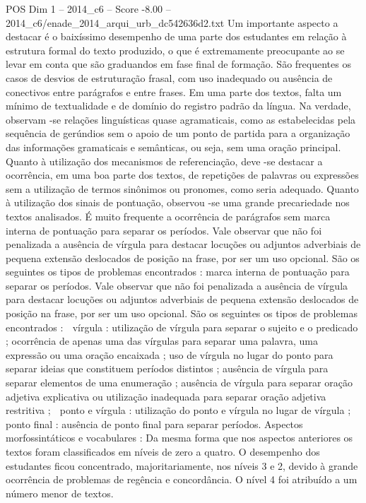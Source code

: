 \begin{textsample}{POS Dim 1 – 2014\_c6 – Score -8.00 – 2014\_c6/enade\_2014\_arqui\_urb\_dc542636d2.txt}
Um importante aspecto a destacar é o baixíssimo desempenho de uma parte dos estudantes em relação à estrutura formal do texto produzido, o que é extremamente preocupante ao se levar em conta que são graduandos em fase final de formação.
São frequentes os casos de desvios de estruturação frasal, com uso inadequado ou ausência de conectivos entre parágrafos e entre frases.
Em uma parte dos textos, falta um mínimo de textualidade e de domínio do registro padrão da língua.
Na verdade, observam -se relações linguísticas quase agramaticais, como as estabelecidas pela sequência de gerúndios sem o apoio de um ponto de partida para a organização das informações gramaticais e semânticas, ou seja, sem uma oração principal.
Quanto à utilização dos mecanismos de referenciação, deve -se destacar a ocorrência, em uma boa parte dos textos, de repetições de palavras ou expressões sem a utilização de termos sinônimos ou pronomes, como seria adequado.
Quanto à utilização dos sinais de pontuação, observou -se uma grande precariedade nos textos analisados.
É muito frequente a ocorrência de parágrafos sem marca interna de pontuação para separar os períodos.
Vale observar que não foi penalizada a ausência de vírgula para destacar locuções ou adjuntos adverbiais de pequena extensão deslocados de posição na frase, por ser um uso opcional.
São os seguintes os tipos de problemas encontrados : marca interna de pontuação para separar os períodos.
Vale observar que não foi penalizada a ausência de vírgula para destacar locuções ou adjuntos adverbiais de pequena extensão deslocados de posição na frase, por ser um uso opcional.
São os seguintes os tipos de problemas encontrados :  vírgula : utilização de vírgula para separar o sujeito e o predicado ; ocorrência de apenas uma das vírgulas para separar uma palavra, uma expressão ou uma oração encaixada ; uso de vírgula no lugar do ponto para separar ideias que constituem períodos distintos ; ausência de vírgula para separar elementos de uma enumeração ; ausência de vírgula para separar oração adjetiva explicativa ou utilização inadequada para separar oração adjetiva restritiva ;  ponto e vírgula : utilização do ponto e vírgula no lugar de vírgula ;  ponto final : ausência de ponto final para separar períodos.
Aspectos morfossintáticos e vocabulares : Da mesma forma que nos aspectos anteriores os textos foram classificados em níveis de zero a quatro.
O desempenho dos estudantes ficou concentrado, majoritariamente, nos níveis 3 e 2, devido à grande ocorrência de problemas de regência e concordância.
O nível 4 foi atribuído a um número menor de textos.

\end{textsample}
